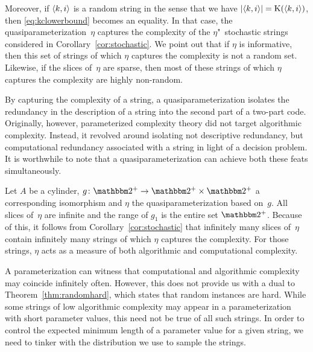 Moreover, if ${\langle k, i\rangle}$ is a random string in the sense that we have ${\lvert{\langle k, i\rangle}\rvert} = \operatorname{K}({\langle k, i\rangle})$, then \eqref{eq:kclowerbound} becomes an equality.
In that case, the quasiparameterization~$\eta$ captures the complexity of the $\eta$"~stochastic strings considered in Corollary~\ref{cor:stochastic}.
We point out that if $\eta$ is informative, then this set of strings of which $\eta$ captures the complexity is not a random set.
Likewise, if the slices of~$\eta$ are sparse, then most of these strings of which $\eta$ captures the complexity are highly non-random.

\begin{example}
\label{ex:simultaneous}%
  By capturing the complexity of a string, a quasiparameterization isolates the redundancy in the description of a string into the second part of a two-part code.
  Originally, however, parameterized complexity theory did not target algorithmic complexity.
  Instead, it revolved around isolating not descriptive redundancy, but computational redundancy associated with a string in light of a decision problem.
  It is worthwhile to note that a quasiparameterization can achieve both these feats simultaneously.

  Let $A$ be a \pdash{}cylinder, $g\colon \binary^+ \to \binary^+ \times \binary^+$ a corresponding isomorphism and $\eta$ the quasiparameterization based on~$g$.
  All slices of~$\eta$ are infinite and the range of $g_1$ is the entire set $\binary^+$.
  Because of this, it follows from Corollary~\ref{cor:stochastic} that infinitely many slices of~$\eta$ contain infinitely many strings of which $\eta$ captures the complexity.
  For those strings, $\eta$ acts as a measure of both algorithmic and computational complexity.
\end{example}

A parameterization can witness that computational and algorithmic complexity may coincide infinitely often.
However, this does not provide us with a dual to Theorem~\ref{thm:randomhard}, which states that random instances are hard.
While some strings of low algorithmic complexity may appear in a parameterization with short parameter values, this need not be true of all such strings.
In order to control the expected minimum length of a parameter value for a given string, we need to tinker with the distribution we use to sample the strings.

